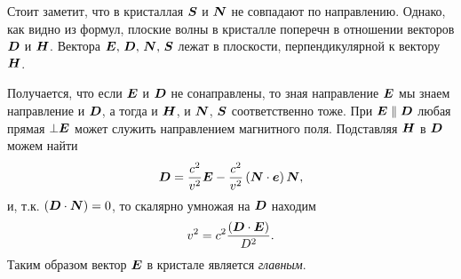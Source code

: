 Стоит заметит, что в кристаллая $\mbox{\boldmath $S$}$ и $\mbox{\boldmath $N$}$ не совпадают по направлению. 
Однако, как видно из формул, плоские волны в кристалле поперечн в отношении векторов $\mbox{\boldmath $D$}$ и $\mbox{\boldmath $H$}$. Вектора $\mbox{\boldmath $E$},\, \mbox{\boldmath $D$},\, \mbox{\boldmath $N$},\,  \mbox{\boldmath $S$}$ лежат в плоскости, перпендикулярной к вектору $\mbox{\boldmath $H$}$. 

Получается, что если $\mbox{\boldmath $E$}$ и $\mbox{\boldmath $D$}$ не сонаправлены, то зная направление $\mbox{\boldmath $E$}$ мы знаем направление и $\mbox{\boldmath $D$}$, а тогда и $\mbox{\boldmath $H$}$, и $\mbox{\boldmath $N$}$, $\mbox{\boldmath $S$}$ соответственно тоже. 
При $\mbox{\boldmath $E$} \parallel \mbox{\boldmath $D$}$ любая прямая $\bot \mbox{\boldmath $E$}$ может служить направлением магнитного поля. 
Подставляя $\mbox{\boldmath $H$}$ в $\mbox{\boldmath $D$}$ можем найти
\begin{equation*}
    \mbox{\boldmath $D$} = \frac{c^2}{v^2} \mbox{\boldmath $E$} - \frac{c^2}{v^2} \left(\mbox{\boldmath $N$} \cdot \mbox{\boldmath $e$} \right) \mbox{\boldmath $N$},
\end{equation*}
и, т.к. $(\mbox{\boldmath $D$} \cdot \mbox{\boldmath $N$})=0$, то скалярно умножая на $\mbox{\boldmath $D$}$ находим
\begin{equation*}
    v^2 = c^2 \frac{(\mbox{\boldmath $D$} \cdot \mbox{\boldmath $E$})}{D^2}.
\end{equation*}
Таким образом вектор $\mbox{\boldmath $E$}$ в кристале является \textit{главным}.
